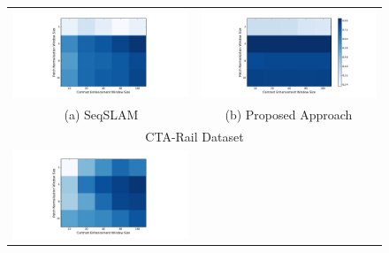 \documentclass[twocolumn]{article}
\begin{document}
\begin{figure}[!htbp]
 \begin{tabular*}{\textwidth}{cc}
 \includegraphics[scale=0.5,trim={4cm 0cm 5cm 0cm},clip]{fig-cta-rail-max-fscore-varyP-varyRw-without} &
 \includegraphics[scale=0.5,trim={5cm 0cm 4cm 0cm},clip]{fig-cta-rail-max-fscore-varyP-varyRw-with} \\
 (a) SeqSLAM & (b) Proposed Approach \\
 \multicolumn{2}{c}{CTA-Rail Dataset} \\
 \includegraphics[scale=0.5,trim={4cm 0cm 5cm 0cm},clip]{fig-indoor-outdoor-max-fscore-varyP-varyRw-without} &

\end{tabular*}
\end{figure}
\end{document}

